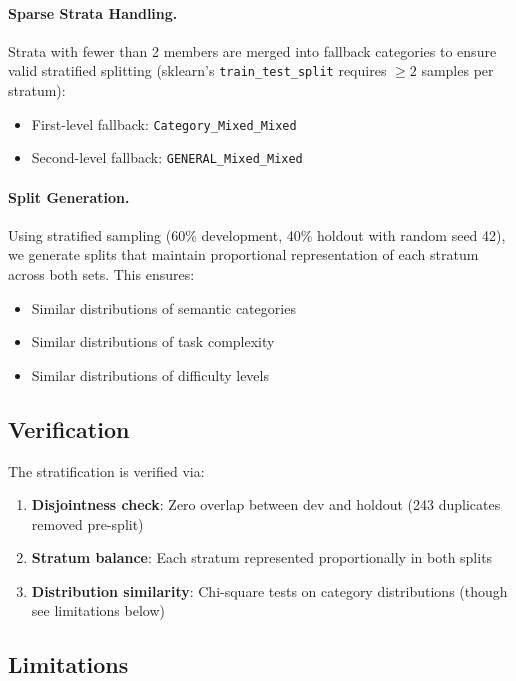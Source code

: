 \paragraph{Sparse Strata Handling.}
Strata with fewer than 2 members are merged into fallback categories to ensure valid stratified splitting (sklearn's \texttt{train\_test\_split} requires $\geq 2$ samples per stratum):
\begin{itemize}
    \item First-level fallback: \texttt{Category\_Mixed\_Mixed}
    \item Second-level fallback: \texttt{GENERAL\_Mixed\_Mixed}
\end{itemize}

\paragraph{Split Generation.}
Using stratified sampling (60\% development, 40\% holdout with random seed 42), we generate splits that maintain proportional representation of each stratum across both sets. This ensures:
\begin{itemize}
    \item Similar distributions of semantic categories
    \item Similar distributions of task complexity
    \item Similar distributions of difficulty levels
\end{itemize}

\subsection{Verification}

The stratification is verified via:
\begin{enumerate}
    \item \textbf{Disjointness check}: Zero overlap between dev and holdout (243 duplicates removed pre-split)
    \item \textbf{Stratum balance}: Each stratum represented proportionally in both splits
    \item \textbf{Distribution similarity}: Chi-square tests on category distributions (though see limitations below)
\end{enumerate}

\subsection{Limitations}

